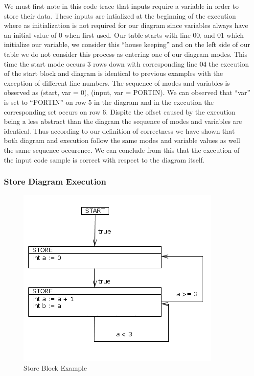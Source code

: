 We must first note in this code trace that inputs require a variable in order to store
their data. These inputs are intialized at the beginning of the execution where as 
initialization is not required for our diagram since variables always have an initial
value of 0 when first used. Our table starts with line 00, and 01 which initialize 
our variable, we consider this ``house keeping'' and on the left side of our table we
do not consider this process as entering one of our diagram modes. This time the start
mode occurs 3 rows down with corresponding line 04 the execution of the start block 
and diagram is identical to previous examples with the exception of different line numbers.
The sequence of modes and variables is observed as {(start, var = 0), (input, var = PORTIN)}.
We can observed that ``var'' is set to ``PORTIN'' on row 5 in the diagram and in the 
execution the corresponding set occurs on row 6. Dispite the offset caused by the execution
being a less abstract than the diagram the sequence of modes and variables are identical.
Thus according to our definition of correctness we have shown that both diagram
and execution follow the same modes and variable values as well the same sequence
occurence. We can conclude from this that the execution of the input code sample is correct
with respect to the diagram itself.

\clearpage
\subsubsection{Store Diagram Execution}

\begin{figure}[h]
	\centering
	\includegraphics[width=\imgmedphoto]{./images/correctness_ex_store.png}
	\caption{Store Block Example}
	\label{fig:correctness_ex_store}
\end{figure}


